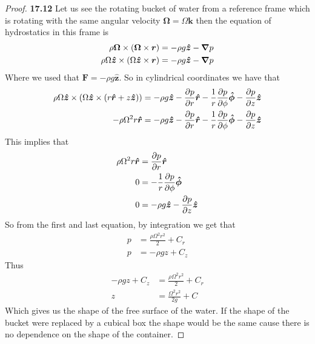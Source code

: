 \documentclass[11pt]{article}
\newcommand{\hatr}{\bm{\hat{r}}}
\newcommand{\hatz}{\bm{\hat{z}}}
\newcommand{\uvk}{\bm{k}}
\newcommand{\hatphi}{\bm{\hat{\phi}}}
\theoremstyle{definition}
\begin{document}
\cleardoublepage
\begin{proof}{\textbf{17.12}}
    Let us see the rotating bucket of water from a reference frame which is
    rotating with the same angular velocity $\bm{\Omega} = \Omega\uvk$
    then the equation of hydrostatics in this frame is 
    \begin{align*}
        \rho\bm{\Omega} \times (\bm{\Omega} \times \bm{r}) &= -\rho g\hatz - \grad p\\
        \rho\Omega\hatz \times (\Omega\hatz \times \bm{r}) &= -\rho g\hatz - \grad p
    \end{align*}
    Where we used that $\bm{F} = -\rho g\hatz$. So in cylindrical coordinates
    we have that
    \begin{align*}
        \rho\Omega\hatz \times (\Omega\hatz \times (r\hatr + z\hatz))
        &= 
        -\rho g\hatz
        - \partialderivative{p}{r}\hatr
        -\frac{1}{r}\partialderivative{p}{\phi}\hatphi
        - \partialderivative{p}{z}\hatz\\
        -\rho\Omega^2 r\hatr
        &= 
        -\rho g\hatz
        - \partialderivative{p}{r}\hatr
        -\frac{1}{r}\partialderivative{p}{\phi}\hatphi
        - \partialderivative{p}{z}\hatz
    \end{align*}
    This implies that 
    \begin{align*}
        \rho\Omega^2 r\hatr &= 
         \partialderivative{p}{r}\hatr\\
        0 &= 
        -\frac{1}{r}\partialderivative{p}{\phi}\hatphi\\
        0 &= 
        -\rho g\hatz
        - \partialderivative{p}{z}\hatz
    \end{align*}
    So from the first and last equation, by integration we get that
    \begin{align*}
        p &= \frac{\rho \Omega^2 r^2}{2} + C_r\\
        p &= -\rho gz + C_z
    \end{align*}
    Thus 
    \begin{align*}
        -\rho gz + C_z &= \frac{\rho \Omega^2 r^2}{2} + C_r\\
        z &= \frac{\Omega^2 r^2}{2g} + C
    \end{align*}
    Which gives us the shape of the free surface of the water.
    If the shape of the bucket were replaced by a cubical box the shape would
    be the same cause there is no dependence on the shape of the container.
\end{proof}
\end{document}
